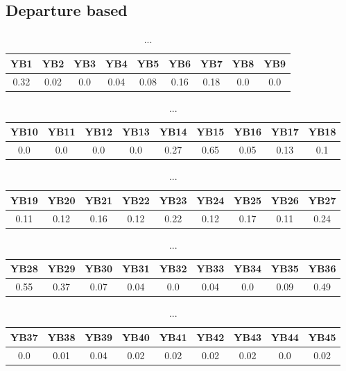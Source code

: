 \documentclass[]{article}
\begin{document}
\subsection{Departure based}
\begin{table}[h]
	\centering
	\begin{tabular}{|c|c|c|c|c|c|c|c|c|}
		\hline
		YB1  & YB2  & YB3 & YB4  & YB5  & YB6  & YB7  & YB8 & YB9 \\
		\hline
		0.32 & 0.02 & 0.0 & 0.04 & 0.08 & 0.16 & 0.18 & 0.0 & 0.0 \\
		\hline
	\end{tabular}
	\caption{...}
\end{table}
\begin{table}[h]
	\centering
	\begin{tabular}{|c|c|c|c|c|c|c|c|c|}
		\hline
		YB10 & YB11 & YB12 & YB13 & YB14 & YB15 & YB16 & YB17 & YB18 \\
		\hline
		0.0  & 0.0  & 0.0  & 0.0  & 0.27 & 0.65 & 0.05 & 0.13 & 0.1  \\
		\hline
	\end{tabular}
	\caption{...}
\end{table}
\begin{table}[h]
	\centering
	\begin{tabular}{|c|c|c|c|c|c|c|c|c|}
		\hline
		YB19 & YB20 & YB21 & YB22 & YB23 & YB24 & YB25 & YB26 & YB27 \\
		\hline
		0.11 & 0.12 & 0.16 & 0.12 & 0.22 & 0.12 & 0.17 & 0.11 & 0.24 \\
		\hline
	\end{tabular}
	\caption{...}
\end{table}
\begin{table}[h]
	\centering
	\begin{tabular}{|c|c|c|c|c|c|c|c|c|}
		\hline
		YB28 & YB29 & YB30 & YB31 & YB32 & YB33 & YB34 & YB35 & YB36 \\
		\hline
		0.55 & 0.37 & 0.07 & 0.04 & 0.0  & 0.04 & 0.0  & 0.09 & 0.49 \\
		\hline
	\end{tabular}
	\caption{...}
\end{table}
\begin{table}[h]
	\centering
	\begin{tabular}{|c|c|c|c|c|c|c|c|c|}
		\hline
		YB37 & YB38 & YB39 & YB40 & YB41 & YB42 & YB43 & YB44 & YB45 \\
		\hline
		0.0  & 0.01 & 0.04 & 0.02 & 0.02 & 0.02 & 0.02 & 0.0  & 0.02 \\
		\hline
	\end{tabular}
	\caption{...}
\end{table}
\end{document}

